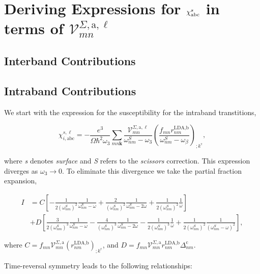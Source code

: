 \section{Deriving Expressions for $\chi^s_{\mathrm{a}\mathrm{b}\mathrm{c}}$ in terms of $\mathcal{V}^{\Sigma,\text{a},\ell}_{mn}$}\label{appv}

\subsection{Interband Contributions}

\subsection{Intraband Contributions}
We start with the expression for the susceptibility for the intraband transtitions,

\begin{equation}\label{intra_first}
\chi_{i,\text{a}\text{b}\text{c}}^{s,\ell}=-\frac{e^3}{\Omega\hbar^2\omega_3}\sum_{mn\mathbf{k}}\frac{\mathcal{V}^{\Sigma,\text{a},\ell}_{mn}}{\omega^S_{nm}-\omega_3}\left(\frac{f_{mn}r^{\text{LDA,b}}_{nm}}{\omega^S_{nm}-\omega_\beta}\right)_{;k^{\text{c}}},
\end{equation} 

where \emph{s} denotes \emph{surface} and \emph{S} refers to the \emph{scissors} correction. This expression diverges as $\omega_{3} \rightarrow 0$. To eliminate this divergence we take the partial fraction expansion,

\begin{align}\label{pfi} 
I & = C \left[-\frac{1}{2(\omega^{S}_{nm})^{2}}\frac{1}{\omega^{S}_{nm}-\omega}+\frac{2}{(\omega^{S}_{nm})^{2}}\frac{1}{\omega^{S}_{nm}-2\omega}+\frac{1}{2(\omega^{S}_{nm})^{2}}\frac{1}{\omega}\right]\nonumber\\
  & + D \left[\frac{3}{2(\omega^{S}_{nm})^{3}}\frac{1}{\omega^{S}_{nm}-\omega} - \frac{4}{(\omega^{S}_{nm})^{3}}\frac{1}{\omega^{S}_{nm}-2\omega} - \frac{1}{2(\omega^{S}_{nm})^{3}}\frac{1}{\omega} + \frac{1}{2(\omega^{S}_{nm})^{2}}\frac{1}{(\omega^{S}_{nm}-\omega)^2}\right],
\end{align} 

where $C = f_{mn}\mathcal{V}^{\Sigma,\text{a}}_{mn}(r^{\text{LDA,b}}_{nm})_{;k^{\text{c}}}$, and $D=f_{mn}\mathcal{V}^{\Sigma,\text{a}}_{mn}r^{\text{LDA,b}}_{nm}\Delta^{\text{c}}_{nm}$.

Time-reversal symmetry leads to the following relationships:


